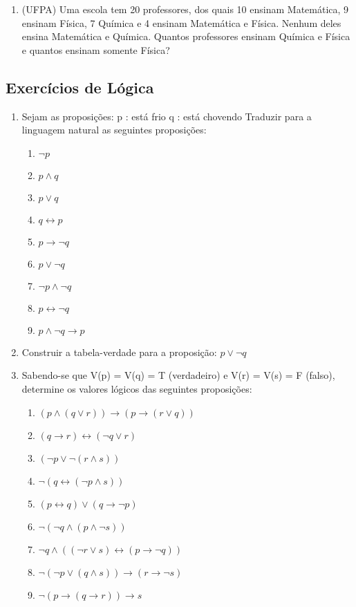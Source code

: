 \documentclass[a4paper,12pt]{article}
\newcommand{\NOT}{\neg}
\newcommand{\IMP}{\to}
\newcommand{\AND}{\wedge}
\newcommand{\OR}{\vee}
\newcommand{\BIMPLI}{\leftrightarrow}
\begin{document}
\begin{center}
\begin{enumerate}
\item(UFPA) Uma escola tem 20 professores, dos quais 10 ensinam Matemática, 9 ensinam Física, 7 Química e 4 ensinam Matemática e Física. Nenhum deles ensina Matemática e Química. Quantos professores ensinam Química e Física e quantos ensinam somente Física?

\end{enumerate}
\newpage

\begin{center}
\section{Exercícios de Lógica}
\end{center}

\begin{enumerate}\item Sejam as proposições: 
p : está frio 
q : está chovendo
Traduzir para a linguagem natural as seguintes proposições:

\begin{enumerate}

\item $\NOT p$ 
\item $p \AND q$ 
\item $p \OR q$
\item $q \BIMPLI p$ 
\item $p \IMP\NOT q$ 
\item $p \OR\NOT q$
\item $\NOT p \AND\NOT q$
\item $p \BIMPLI \NOT q$
\item $p \AND\NOT q \IMP p$

\end{enumerate}

\item Construir a tabela-verdade para a proposição: $p \OR\NOT q$


\item Sabendo-se que V(p) = V(q) = T (verdadeiro) e V(r) = V(s) = F (falso), determine os valores lógicos das seguintes proposições:

\begin{enumerate}

\item  $(p \AND (q \OR r)) \IMP (p \IMP (r \OR q))$
\item  $(q \IMP r) \BIMPLI (\NOT q \OR r)$
\item  $(\NOT p  \OR\NOT(r \AND s))$
\item  $\NOT(q \BIMPLI ( \NOT p \AND s))$
\item  $(p \BIMPLI q) \OR (q \IMP\NOT p)$
\item  $\NOT(\NOT q \AND (p \AND\NOT s))$
\item  $\NOT q \AND ((\NOT r \OR s) \BIMPLI (p \IMP \NOT q))$
\item  $\NOT(\NOT p \OR (q \AND s)) \IMP (r \IMP \NOT s)$
\item  $\NOT (p \IMP (q \IMP r)) \IMP s$


\end{enumerate}
\end{enumerate}
\end{center}
\end{document}
